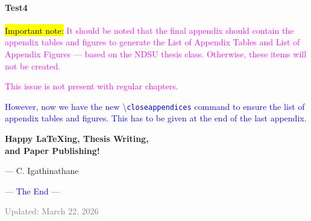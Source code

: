 \documentclass[phd,showframe]{ndsu-thesis-2022}
\newcommand\italk[1]{\textcolor{blue}{#1}}  %
\newcommand\cmd[1]{\textbackslash\texttt{#1}}  %
\begin{document}
\paragraph{Test4}

{\hl{Important note:}
\textcolor{magenta}{It should be noted that the final appendix should contain the appendix tables and figures to generate the List of Appendix Tables and List of Appendix Figures --- based on the NDSU thesis class. Otherwise, these items will not be created.}
} 

\textcolor{magenta}{This issue is not present with regular chapters.}

\italk{However, now we have the new \cmd{closeappendices} command to ensure the list of appendix tables and figures. This has to be given at the end of the last appendix.}

\vspace{1cm}
\begin{center}
{\LARGE\bfseries
Happy {\LaTeX}ing, Thesis Writing, \\
and Paper Publishing!
}
\end{center}

\hfill {\footnotesize --- C. Igathinathane}

\vspace{0.1in}
\begin{center}
\italk{--- The End ---}
\end{center}

\vfill
{\noindent\scriptsize\textcolor{gray}{Updated: March 22, 2026}}

\closeappendices  %
\end{document}
